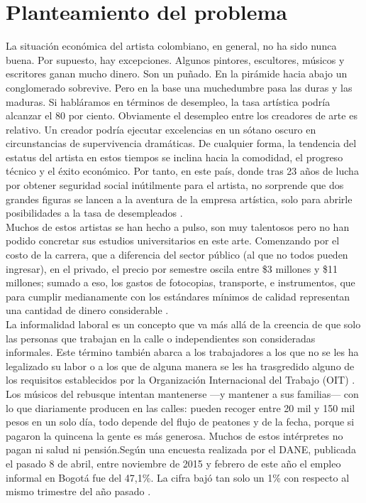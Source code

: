 \section{Planteamiento del problema}

La situación económica del artista colombiano, en general, no ha sido nunca buena. Por supuesto, hay excepciones. Algunos pintores, escultores, músicos y escritores ganan mucho dinero. Son un puñado. En la pirámide hacia abajo un conglomerado sobrevive. Pero en la base una muchedumbre pasa las duras y las maduras. Si habláramos en términos de desempleo, la tasa artística podría alcanzar el 80 por ciento. Obviamente el desempleo entre los creadores de arte es relativo. Un creador podría ejecutar excelencias en un sótano oscuro en circunstancias de supervivencia dramáticas. De cualquier forma, la tendencia del estatus del artista en estos tiempos se inclina hacia la comodidad, el progreso técnico y el éxito económico. Por tanto, en este país, donde tras 23 años de lucha por obtener seguridad social inútilmente para el artista, no sorprende que dos grandes figuras se lancen a la aventura de la empresa artística, solo para abrirle posibilidades a la tasa de desempleados .\\

Muchos de estos artistas se han hecho a pulso, son muy talentosos pero no han podido concretar sus estudios universitarios en este arte. Comenzando por el costo de la carrera, que a diferencia del sector público (al que no todos pueden ingresar), en el privado, el precio por semestre oscila entre \$3 millones y \$11 millones; sumado a eso, los gastos de fotocopias, transporte, e instrumentos, que para cumplir medianamente con los estándares mínimos de calidad representan una cantidad de dinero considerable .\\

La informalidad laboral es un concepto que va más allá de la creencia de que solo las personas que trabajan en la calle o independientes son consideradas informales. Este término también abarca a los trabajadores a los que no se les ha legalizado su labor o a los que de alguna manera se les ha trasgredido alguno de los requisitos establecidos por la Organización Internacional del Trabajo (OIT) .\\

Los músicos del rebusque intentan mantenerse —y mantener a sus familias— con lo que diariamente producen en las calles: pueden recoger entre 20 mil y 150 mil pesos en un solo día, todo depende del flujo de peatones y de la fecha, porque si pagaron la quincena la gente es más generosa. Muchos de estos intérpretes no pagan ni salud ni pensión.Según una encuesta realizada por el DANE, publicada el pasado 8 de abril, entre noviembre de 2015 y febrero de este año el empleo informal en Bogotá fue del 47,1\%. La cifra bajó tan solo un 1\% con respecto al mismo trimestre del año pasado .\\

